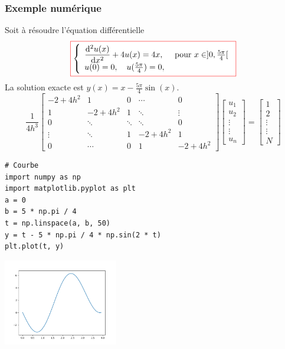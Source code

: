 \documentclass{beamer}
\def \de {{\rm d}}
\newcommand{\myredbox}[1]{\fcolorbox{red}{white}{$\displaystyle#1$}}
\begin{document}
 
 
\begin{frame} 
\frametitle{Exemple numérique}
Soit à résoudre l'équation différentielle
\begin{equation}
\myredbox{\left\{\begin{array}{l}
{\displaystyle \frac{\de^2 u(x)}{\de x^2}}+4 u(x) =4x, \quad \mbox{ pour }x\in ]0,\frac{5\pi}{4}[ \\
u(0)=0,\quad u(\frac{5\pi}{4})=0,
\end{array}\right.}
\end{equation}
La solution exacte est $y(x)=x-\frac{5\pi}{4}\sin(x)$.
 \[\frac{1}{4h^3}
\left[\begin{array}{ccccc}
-2+4h^2&1&0&\cdots&0\\
1&-2+4h^2&1&\ddots&\vdots\\
0&  \ddots &\ddots&\ddots&0\\
\vdots &\ddots &1&-2+4h^2&1\\
   0&\cdots &0&1 &-2+4h^2
\end{array}\right]
\left[\begin{array}{c}
u_1\\u_2\\ \vdots \\ \vdots  \\ u_n
\end{array}\right]=\left[\begin{array}{c}
1\\2\\ \vdots \\ \vdots  \\ N
\end{array}\right]
\] 
\end{frame}
\begin{frame}[fragile] 

\begin{verbatim}
# Courbe
import numpy as np
import matplotlib.pyplot as plt
a = 0
b = 5 * np.pi / 4
t = np.linspace(a, b, 50)
y = t - 5 * np.pi / 4 * np.sin(2 * t)
plt.plot(t, y)
\end{verbatim}

 \begin{center}
\includegraphics[width=5cm]{courbe.png}
\end{center}
 \end{frame}
 
\end{document}
